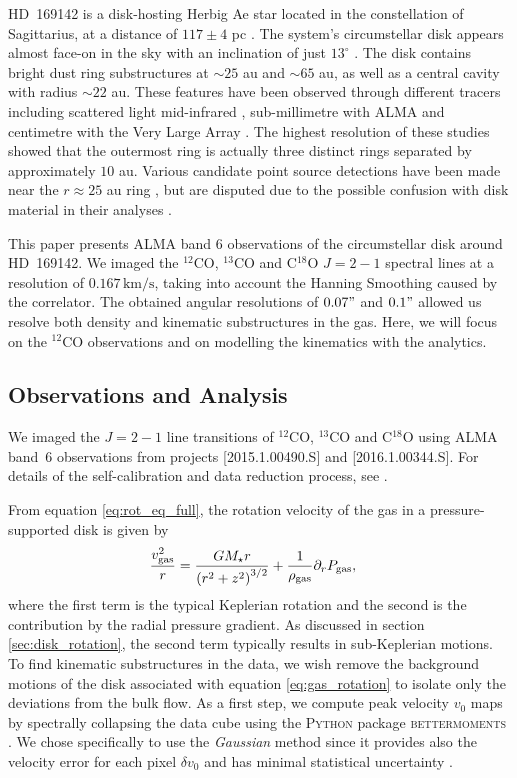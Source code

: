 HD~169142 is a disk-hosting Herbig Ae star located in the constellation of Sagittarius, at a distance of $117 \pm 4$ pc \citep{brown2016}.
The system's circumstellar disk appears almost face-on in the sky with an inclination of just $13^\circ$ \citep{raman2006,panic2008}.
The disk contains bright dust ring substructures at $\sim25$ au and $\sim65$ au, as well as a central cavity with radius $\sim22$ au.
These features have been observed through different tracers including scattered light \citep{quanz2013a,momose2015,pohl2017,bertrang2018} mid-infrared \citep{honda2012}, sub-millimetre with ALMA \citep{fedele2017,macias2019,perez2019} and centimetre with the Very Large Array \citep{osorio2014}.
The highest resolution of these studies showed that the outermost ring is actually three distinct rings separated by approximately $10$ au.
Various candidate point source detections have been made near the $r \approx 25$ au ring \citep{biller2014,reggiani2014,gratton2019}, but are disputed due to the possible confusion with disk material in their analyses \citep{ligi2018}.

This paper presents ALMA band 6 observations of the circumstellar disk around HD~169142.
We imaged the $^{12}$CO, $^{13}$CO and C$^{18}$O $J=2-1$ spectral lines at a resolution of $0.167 \, \mathrm{km/s}$, taking into account the Hanning Smoothing caused by the correlator.
The obtained angular resolutions of $0.07"$ and $0.1"$ allowed us resolve both density and kinematic substructures in the gas. Here, we will focus on the $^{12}$CO observations and on modelling the kinematics with the analytics.

\subsection{Observations and Analysis}

We imaged the $J=2-1$ line transitions of $^{12}$CO, $^{13}$CO and C$^{18}$O using ALMA band~6 observations from projects [2015.1.00490.S] and [2016.1.00344.S].
For details of the self-calibration and data reduction process, see \citet{garg2022}.

From equation \ref{eq:rot_eq_full}, the rotation velocity of the gas in a pressure-supported disk is given by 
\begin{align}
    \frac{v_{\rm gas}^2}{r} &= \frac{G M_\star r}{\left( r^2 + z^2  \right)^{3/2}} + \frac{1}{\rho_{\rm gas}} \partial_r P_{\rm gas}, \label{eq:gas_rotation}
\end{align}
where the first term is the typical Keplerian rotation and the second is the contribution by the radial pressure gradient.
As discussed in section \ref{sec:disk_rotation}, the second term typically results in sub-Keplerian motions.
To find kinematic substructures in the data, we wish remove the background motions of the disk associated with equation \ref{eq:gas_rotation} to isolate only the deviations from the bulk flow.
As a first step, we compute peak velocity $v_0$ maps by spectrally collapsing the data cube using the \textsc{Python} package \textsc{bettermoments} \citep{teague2018a}.
We chose specifically to use the \textit{Gaussian} method since it provides also the velocity error for each pixel $\delta v_0$ and has minimal statistical uncertainty \citep{yu2021}.

